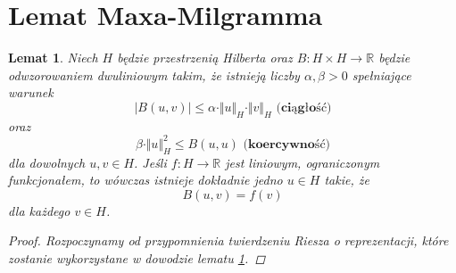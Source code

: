 \documentclass[12pt,a4paper,oneside,titlepage]{article}
\newtheorem{Lemat}{Lemat}
\begin{document}
\section{Lemat Maxa-Milgramma}
\begin{Lemat}  \label{l1}
Niech $H$ będzie przestrzenią Hilberta oraz $B: H \times H \rightarrow \mathbb{R}$ będzie odwzorowaniem dwuliniowym takim, że istnieją liczby $\alpha, \beta>0 $ spełniające warunek
\begin{equation} \label{N1}
\vert B(u,v) \vert \leq \alpha \cdot \Vert u \Vert_{H} \cdot \Vert v \Vert_H \textbf{   (ciągłość)}
\end{equation}
oraz
\begin{equation}
\beta \cdot \Vert u \Vert_H^2 \leq B(u,u) \textbf{  (koercywność)}
\end{equation}
dla dowolnych $u,v \in H$. Jeśli $f:H \rightarrow \mathbb{R}$ jest liniowym, ograniczonym funkcjonałem, to wówczas istnieje dokładnie jedno $u \in H$ takie, że
\begin{equation}
\nonumber
B(u,v) = f(v)
\end{equation}
dla każdego $v \in H$.
\begin{proof}
Rozpoczynamy od przypomnienia twierdzeniu Riesza o reprezentacji, które zostanie wykorzystane w dowodzie lematu \ref{l1}. 


\end{proof}
\end{Lemat}
\end{document}
